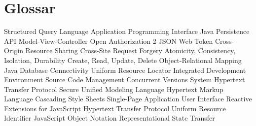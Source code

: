 \chapter{Glossar}

			{Structured Query Language}
			{Application Programming Interface}
			{Java Persistence API}
			{Model-View-Controller}
		{Open Authorization 2}
			{JSON Web Token}
			{Cross-Origin Resource Sharing}
			{Cross-Site Request Forgery}
			{Atomicity, Consistency, Isolation, Durability}
			{Create, Read, Update, Delete}
			{Object-Relational Mapping}
		{Java Database Connectivity Uniform Resource Locator}
			{Integrated Development Environment}
	      {Source Code Management }
			{Concurrent Versions System}
		{Hypertext Transfer Protocol Secure}
			{Unified Modeling Language}
			{Hypertext Markup Language}
			{Cascading Style Sheets}
			{Single-Page Application}
			{User Interface}
			{Reactive Extensions for JavaScript}
			{Hypertext Transfer Protocol}
			{Uniform Resource Identifier}
			{JavaScript Object Notation}
		{Representational State Transfer}


